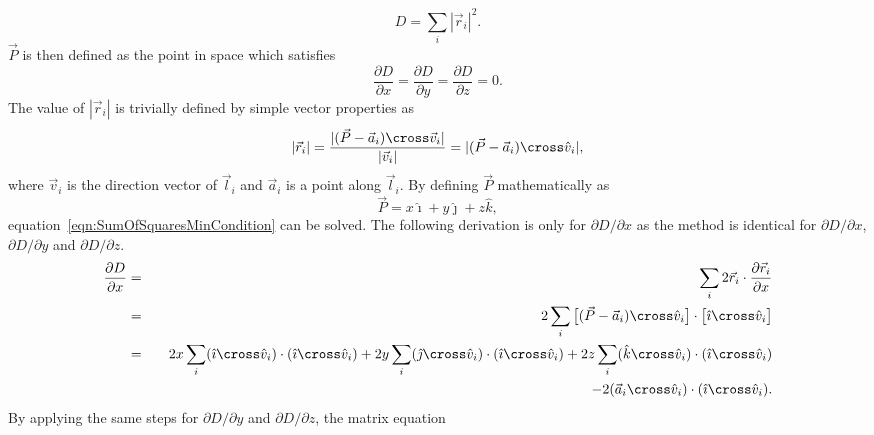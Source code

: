 \begin{equation}
  D = \sum_i |\vec{r}_i|^2.
  \label{eqn:SumOfSquares}
\end{equation}
$\vec{P}$ is then defined as the point in space which satisfies
\begin{equation}
  \frac{\partial D}{\partial x} = \frac{\partial D}{\partial y} = \frac{\partial D}{\partial z} = 0.
  \label{eqn:SumOfSquaresMinCondition}
\end{equation}
The value of $|\vec{r}_i|$ is trivially defined by simple vector properties as 
\begin{equation}
  |\vec{r}_i| = \frac{|(\vec{P} - \vec{a}_i) \cross \vec{v}_i|}{|\vec{v}_i|} = |(\vec{P} - \vec{a}_i) \cross \hat{v}_i|,
  \label{eqn:DistanceOfPointToLine}
\end{equation}
where $\vec{v}_i$ is the direction vector of $\vec{l}_i$ and $\vec{a}_i$ is a point along $\vec{l}_i$.  By defining $\vec{P}$ mathematically as
\begin{equation}
  \vec{P} = x\hat{\imath} + y\hat{\jmath} + z\hat{k},
  \label{eqn:PDefinition}
\end{equation}
equation~\ref{eqn:SumOfSquaresMinCondition} can be solved.  The following derivation is only for $\partial D/\partial x$ as the method is identical for $\partial D/\partial x$, $\partial D/\partial y$ and $\partial D/\partial z$.
\begin{eqnarray}
  \frac{\partial D}{\partial x} & = & \sum_i 2\vec{r}_i \cdot \frac{\partial \vec{r}_i}{\partial x} \\
  & = & 2\sum_i \big[(\vec{P} - \vec{a}_i) \cross \hat{v}_i\big] \cdot \big[\hat{\imath} \cross \hat{v}_i\big] \nonumber \\
  & = & 2x \sum_i (\hat{\imath} \cross \hat{v}_i) \cdot ( \hat{\imath} \cross \hat{v}_i) + 2y \sum_i (\hat{\jmath} \cross \hat{v}_i) \cdot ( \hat{\imath} \cross \hat{v}_i) + 2z \sum_i (\hat{k} \cross \hat{v}_i) \cdot ( \hat{\imath} \cross \hat{v}_i) \nonumber \\
  &\qquad & - 2(\vec{a}_i \cross \hat{v}_i) \cdot ( \hat{\imath} \cross \hat{v}_i). \nonumber
  \label{eqn:dDdxDerivation}
\end{eqnarray}
By applying the same steps for $\partial D/\partial y$ and $\partial D/\partial z$, the matrix equation
